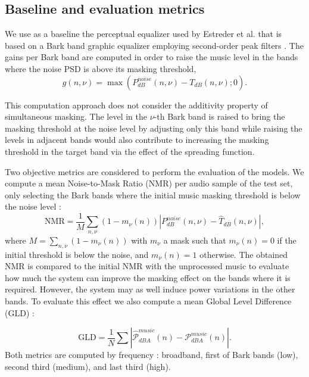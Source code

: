 \subsection{Baseline and evaluation metrics}

We use as a baseline the perceptual equalizer used by Estreder et al. \cite{estrederPerceptualAudioEqualization2018} that is based on a Bark band graphic equalizer employing second-order peak filters \cite{abelFilterDesignUsing2004a, valimakiAllAudioEqualization2016}.
The gains per Bark band are computed in order to raise the music level in the bands where the noise PSD is above its masking threshold,
\begin{equation}
    g(n,\nu) = \max \left( P_{dB}^{noise}(n,\nu) - T_{dB}(n,\nu); 0 \right) .
    \label{eq:estreder}
\end{equation}

This computation approach does not consider the additivity property of simultaneous masking.  The level in the $\nu$-th Bark band is raised to bring the masking threshold at the noise level by adjusting only this band while raising the levels in adjacent bands would also contribute to increasing the masking threshold in the target band via the effect of the spreading function.

Two objective metrics are considered to perform the evaluation of the models. We compute a mean Noise-to-Mask Ratio (NMR) per audio sample of the test set, only selecting the Bark bands where the initial music masking threshold is below the noise level :
\begin{equation}
\text{NMR} = \frac{1}{M} \sum_{n, \nu} (1-m_\nu(n)) | P_{dB}^{noise}(n,\nu) - \hat{T}_{dB}(n,\nu) |,
\end{equation} 
where $M = \sum_{n, \nu} (1-m_\nu(n))$ with $m_\nu$ a mask such that $m_\nu(n) = 0$ if the initial threshold is below the noise, and $m_\nu(n) = 1$ otherwise. The obtained NMR is compared to the initial NMR with the unprocessed music to evaluate how much the system can improve the masking effect on the bands where it is required. However, the system may as well induce power variations in the other bands. To evaluate this effect we also compute a mean Global Level Difference (GLD) :

\begin{equation}
    \text{GLD} = \frac{1}{N} \sum | \hat{\mathcal{P}}_{dBA}^{music}(n) - \mathcal{P}_{dBA}^{music}(n) | .
\end{equation}
Both metrics are computed by frequency : broadband, first  of Bark bands (low), second third (medium), and last third (high). 

